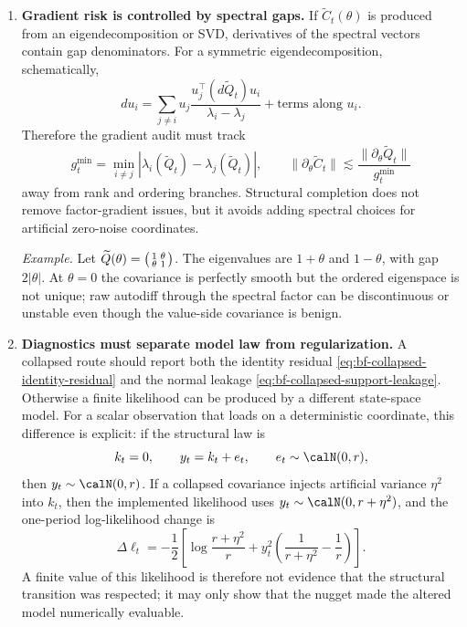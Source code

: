 \begin{enumerate}[label=(\roman*)]
  \item \textbf{Gradient risk is controlled by spectral gaps.}  If
    $\widetilde C_t(\theta)$ is produced from an eigendecomposition or SVD,
    derivatives of the spectral vectors contain gap denominators.  For a
    symmetric eigendecomposition, schematically,
    \[
      d u_i
      =
      \sum_{j\ne i}
      u_j
      \frac{u_j^\top(d\widetilde Q_t)u_i}{\lambda_i-\lambda_j}
      +\text{terms along }u_i .
      \label{eq:bf-collapsed-spectral-gap-gradient}
    \]
    Therefore the gradient audit must track
    \[
      g_t^{\min}
      =
      \min_{i\ne j}|\lambda_i(\widetilde Q_t)-\lambda_j(\widetilde Q_t)|,
      \qquad
      \|\partial_\theta\widetilde C_t\|
      \lesssim
      \frac{\|\partial_\theta\widetilde Q_t\|}{g_t^{\min}}
    \]
    away from rank and ordering branches.  Structural completion does not
    remove factor-gradient issues, but it avoids adding spectral choices for
    artificial zero-noise coordinates.

    \emph{Example.}  Let
    $\widetilde Q(\theta)=
    \begin{psmallmatrix}1&\theta\\ \theta&1\end{psmallmatrix}$.
    The eigenvalues are $1+\theta$ and $1-\theta$, with gap $2|\theta|$.
    At $\theta=0$ the covariance is perfectly smooth but the ordered
    eigenspace is not unique; raw autodiff through the spectral factor can be
    discontinuous or unstable even though the value-side covariance is benign.

  \item \textbf{Diagnostics must separate model law from regularization.}  A
    collapsed route should report both the identity residual
    \eqref{eq:bf-collapsed-identity-residual} and the normal leakage
    \eqref{eq:bf-collapsed-support-leakage}.  Otherwise a finite likelihood can
    be produced by a different state-space model.  For a scalar observation
    that loads on a deterministic coordinate, this difference is explicit:
    if the structural law is
    \[
      k_t=0,\qquad y_t=k_t+e_t,\qquad e_t\sim\calN(0,r),
    \]
    then $y_t\sim\calN(0,r)$.  If a collapsed covariance injects artificial
    variance $\eta^2$ into $k_t$, then the implemented likelihood uses
    $y_t\sim\calN(0,r+\eta^2)$, and the one-period log-likelihood change is
    \[
      \Delta\ell_t
      =
      -\frac12
      \left[
        \log\frac{r+\eta^2}{r}
        +
        y_t^2
        \left(\frac{1}{r+\eta^2}-\frac{1}{r}\right)
      \right].
      \label{eq:bf-collapsed-nugget-likelihood-change}
    \]
    A finite value of this likelihood is therefore not evidence that the
    structural transition was respected; it may only show that the nugget made
    the altered model numerically evaluable.
\end{enumerate}

